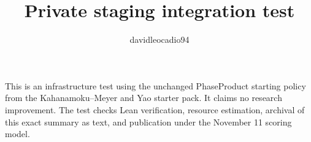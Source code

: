 \documentclass{article}
\title{Private staging integration test}
\author{davidleocadio94}
\begin{document}
\maketitle
This is an infrastructure test using the unchanged PhaseProduct starting policy from the Kahanamoku--Meyer and Yao starter pack. It claims no research improvement.
The test checks Lean verification, resource estimation, archival of this exact summary as text, and publication under the November 11 scoring model.
\immediate{}
\end{document}
